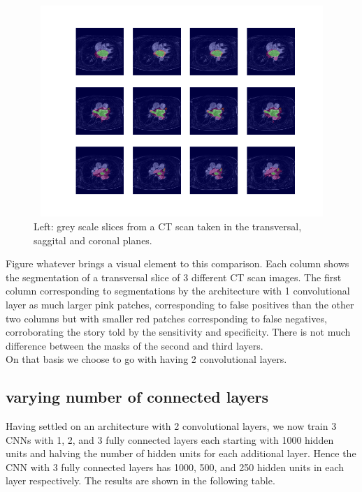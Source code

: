 \begin{figure}
\centering
\includegraphics[trim=2.5cm 1.5cm 2cm 1.5cm, clip=true, height=80mm, width=150mm]{Chapter3/mask_results_varying_number_of_convolutional_layers.png}
\caption{Left: grey scale slices from a CT scan taken in the transversal, saggital and coronal planes.}
\end{figure}

\noindent Figure whatever brings a visual element to this comparison. Each column shows the segmentation of a transversal slice of 3 different CT scan images. The first column corresponding to segmentations by the architecture with 1 convolutional layer as much larger pink patches, corresponding to false positives than the other two columns but with smaller red patches corresponding to false negatives, corroborating the story told by the sensitivity and specificity. There is not much difference between the masks of the second and third layers.\\

\noindent On that basis we choose to go with having 2 convolutional layers. 

\subsection{varying number of connected layers}

\noindent Having settled on an architecture with 2 convolutional layers, we now train 3 CNNs with 1, 2, and 3 fully connected layers each starting with 1000 hidden units and halving the number of hidden units for each additional layer. Hence the CNN with 3 fully connected layers has 1000, 500, and 250 hidden units in each layer respectively. The results are shown in the following table.\\

